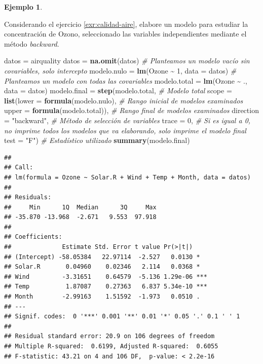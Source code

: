 \documentclass[
  11pt,
]{book}
\newenvironment{Shaded}{\begin{snugshade}}{\end{snugshade}}
\newcommand{\AttributeTok}[1]{\textcolor[rgb]{0.13,0.29,0.53}{#1}}
\newcommand{\CommentTok}[1]{\textcolor[rgb]{0.56,0.35,0.01}{\textit{#1}}}
\newcommand{\DecValTok}[1]{\textcolor[rgb]{0.00,0.00,0.81}{#1}}
\newcommand{\FunctionTok}[1]{\textcolor[rgb]{0.13,0.29,0.53}{\textbf{#1}}}
\newcommand{\NormalTok}[1]{#1}
\newcommand{\OtherTok}[1]{\textcolor[rgb]{0.56,0.35,0.01}{#1}}
\newcommand{\SpecialCharTok}[1]{\textcolor[rgb]{0.81,0.36,0.00}{\textbf{#1}}}
\newcommand{\StringTok}[1]{\textcolor[rgb]{0.31,0.60,0.02}{#1}}
\theoremstyle{definition}
\theoremstyle{definition}
\newtheorem{example}{Ejemplo}[chapter]
\theoremstyle{definition}
\theoremstyle{definition}
\theoremstyle{remark}
\begin{document}
\begin{example}
\protect\hypertarget{exm:backward1}{}\label{exm:backward1}

Considerando el ejercicio \ref{exr:calidad-aire}, elabore un modelo para estudiar la concentración de Ozono, seleccionado las variables independientes mediante el método \emph{backward}.

\begin{Shaded}
\begin{Highlighting}[]
\NormalTok{datos }\OtherTok{=}\NormalTok{ airquality}
\NormalTok{datos }\OtherTok{=} \FunctionTok{na.omit}\NormalTok{(datos)}
\CommentTok{\# Planteamos un modelo vacío sin covariables, solo intercepto}
\NormalTok{modelo.nulo }\OtherTok{=} \FunctionTok{lm}\NormalTok{(Ozone }\SpecialCharTok{\textasciitilde{}} \DecValTok{1}\NormalTok{, }\AttributeTok{data =}\NormalTok{ datos)}
\CommentTok{\# Planteamos un modelo con todas las covariables}
\NormalTok{modelo.total }\OtherTok{=} \FunctionTok{lm}\NormalTok{(Ozone }\SpecialCharTok{\textasciitilde{}}\NormalTok{ ., }\AttributeTok{data =}\NormalTok{ datos)}
\NormalTok{modelo.final }\OtherTok{=} \FunctionTok{step}\NormalTok{(modelo.total, }\CommentTok{\# Modelo total}
                    \AttributeTok{scope =} \FunctionTok{list}\NormalTok{(}\AttributeTok{lower =} \FunctionTok{formula}\NormalTok{(modelo.nulo), }\CommentTok{\# Rango inicial de modelos examinados}
                                 \AttributeTok{upper =} \FunctionTok{formula}\NormalTok{(modelo.total)), }\CommentTok{\# Rango final de modelos examinados}
                    \AttributeTok{direction =} \StringTok{"backward"}\NormalTok{, }\CommentTok{\# Método de selección de variables}
                    \AttributeTok{trace =} \DecValTok{0}\NormalTok{, }\CommentTok{\# Si es igual a 0, no imprime todos los modelos que va elaborando, solo imprime el modelo final}
                    \AttributeTok{test =} \StringTok{"F"}\NormalTok{) }\CommentTok{\# Estadístico utilizado}
\FunctionTok{summary}\NormalTok{(modelo.final)}
\end{Highlighting}
\end{Shaded}

\begin{verbatim}
## 
## Call:
## lm(formula = Ozone ~ Solar.R + Wind + Temp + Month, data = datos)
## 
## Residuals:
##     Min      1Q  Median      3Q     Max 
## -35.870 -13.968  -2.671   9.553  97.918 
## 
## Coefficients:
##              Estimate Std. Error t value Pr(>|t|)    
## (Intercept) -58.05384   22.97114  -2.527   0.0130 *  
## Solar.R       0.04960    0.02346   2.114   0.0368 *  
## Wind         -3.31651    0.64579  -5.136 1.29e-06 ***
## Temp          1.87087    0.27363   6.837 5.34e-10 ***
## Month        -2.99163    1.51592  -1.973   0.0510 .  
## ---
## Signif. codes:  0 '***' 0.001 '**' 0.01 '*' 0.05 '.' 0.1 ' ' 1
## 
## Residual standard error: 20.9 on 106 degrees of freedom
## Multiple R-squared:  0.6199, Adjusted R-squared:  0.6055 
## F-statistic: 43.21 on 4 and 106 DF,  p-value: < 2.2e-16
\end{verbatim}

\end{example}
\end{document}
